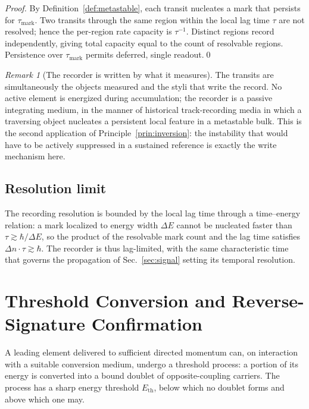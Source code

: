 \documentclass[twocolumn,10pt,a4paper]{article}
\theoremstyle{thmstyle}
\theoremstyle{definition}
\theoremstyle{remark}
\newtheorem{remark}[theorem]{Remark}
\begin{document}
\begin{proof}
By Definition~\ref{def:metastable}, each transit nucleates a mark that
persists for $\tau_{\mathrm{mark}}$. Two transits through the same region
within the local lag time $\tau$ are not resolved; hence the per-region rate
capacity is $\tau^{-1}$. Distinct regions record independently, giving total
capacity equal to the count of resolvable regions. Persistence over
$\tau_{\mathrm{mark}}$ permits deferred, single readout.\qed
\end{proof}

\begin{remark}[The recorder is written by what it measures]
The transits are simultaneously the objects measured and the styli that write
the record. No active element is energized during accumulation; the recorder
is a passive integrating medium, in the manner of historical track-recording
media in which a traversing object nucleates a persistent local feature in a
metastable bulk. This is the second application of
Principle~\ref{prin:inversion}: the instability that would have to be actively
suppressed in a sustained reference is exactly the write mechanism here.
\end{remark}

\subsection{Resolution limit}

The recording resolution is bounded by the local lag time through a
time--energy relation: a mark localized to energy width $\Delta E$ cannot be
nucleated faster than $\tau\gtrsim\hbar/\Delta E$, so the product of the
resolvable mark count and the lag time satisfies $\Delta n\cdot\tau\gtrsim
\hbar$. The recorder is thus lag-limited, with the same characteristic time
that governs the propagation of Sec.~\ref{sec:signal} setting its temporal
resolution.

\section{Threshold Conversion and Reverse-Signature Confirmation}
\label{sec:threshold}

A leading element delivered to sufficient directed momentum can, on
interaction with a suitable conversion medium, undergo a threshold process: a
portion of its energy is converted into a bound doublet of opposite-coupling
carriers. The process has a sharp energy threshold $E_{\mathrm{th}}$, below
which no doublet forms and above which one may.
\end{document}
